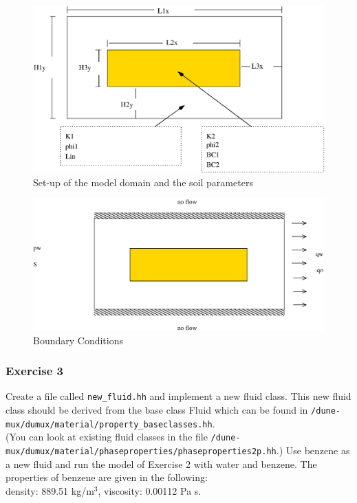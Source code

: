 \begin{figure}[h]
\centering
\includegraphics[width=0.8\linewidth,keepaspectratio]{EPS/Ex2_Domain.eps}
\caption{Set-up of the model domain and the soil parameters}\label{tutorial-coupled:ex2_Domain}
\end{figure}

\begin{figure}[h]
\centering
\includegraphics[width=0.8\linewidth,keepaspectratio]{EPS/Ex2_Boundary.eps}
\caption{Boundary Conditions}\label{tutorial-coupled:ex2_BC}
\end{figure}

\subsubsection{Exercise 3}
Create a file called \texttt{new\_fluid.hh} and implement a new fluid class. This new fluid class should be derived from the base class Fluid which can be found in  \texttt{/dune-mux/dumux/material/property\_baseclasses.hh}. \\
(You can look at existing fluid classes in the file \texttt{/dune-mux/dumux/material/phaseproperties/phaseproperties2p.hh}.)
Use benzene as a new fluid and run the model of Exercise 2 with water and benzene. The properties of benzene are given in the following: \\
density: 889.51 kg/$\text{m}^3$, viscosity: 0.00112 Pa s. 
